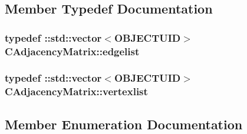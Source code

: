 \subsection{Member Typedef Documentation}
\hypertarget{class_c_adjacency_matrix_a22be75654b2f4c6c0e36471c5d6521fd}{}
\subsubsection[{edgelist}]{\setlength{\rightskip}{0pt plus 5cm}typedef \+::std\+::vector$<${\bf O\+B\+J\+E\+C\+T\+U\+I\+D}$>$ {\bf C\+Adjacency\+Matrix\+::edgelist}}\label{class_c_adjacency_matrix_a22be75654b2f4c6c0e36471c5d6521fd}
\hypertarget{class_c_adjacency_matrix_a8693a9f946f9f2142a9a7cb2b84f4b4c}{}
\subsubsection[{vertexlist}]{\setlength{\rightskip}{0pt plus 5cm}typedef \+::std\+::vector$<${\bf O\+B\+J\+E\+C\+T\+U\+I\+D}$>$ {\bf C\+Adjacency\+Matrix\+::vertexlist}}\label{class_c_adjacency_matrix_a8693a9f946f9f2142a9a7cb2b84f4b4c}


\subsection{Member Enumeration Documentation}
\hypertarget{class_c_adjacency_matrix_a0a423c30d8ec51bbdb1dbc7c192372e5}{}
